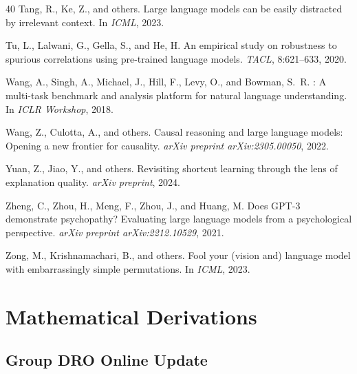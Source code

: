 \documentclass[10pt,twocolumn]{article}
\begin{document}
\begin{thebibliography}{40}
Tang, R., Ke, Z., and others.
\newblock Large language models can be easily distracted by irrelevant context.
\newblock In \emph{ICML}, 2023.

Tu, L., Lalwani, G., Gella, S., and He, H.
\newblock An empirical study on robustness to spurious correlations using
  pre-trained language models.
\newblock \emph{TACL}, 8:621--633, 2020.

Wang, A., Singh, A., Michael, J., Hill, F., Levy, O., and Bowman, S.~R.
: A multi-task benchmark and analysis platform for natural
  language understanding.
\newblock In \emph{ICLR Workshop}, 2018.

Wang, Z., Culotta, A., and others.
\newblock Causal reasoning and large language models: Opening a new
  frontier for causality.
\newblock \emph{arXiv preprint arXiv:2305.00050}, 2022.

Yuan, Z., Jiao, Y., and others.
\newblock Revisiting shortcut learning through the lens of explanation quality.
\newblock \emph{arXiv preprint}, 2024.

Zheng, C., Zhou, H., Meng, F., Zhou, J., and Huang, M.
\newblock Does {GPT-3} demonstrate psychopathy? Evaluating large language
  models from a psychological perspective.
\newblock \emph{arXiv preprint arXiv:2212.10529}, 2021.

Zong, M., Krishnamachari, B., and others.
\newblock Fool your (vision and) language model with embarrassingly simple
  permutations.
\newblock In \emph{ICML}, 2023.

\end{thebibliography}

\appendix
\section{Mathematical Derivations}
\label{app:derivations}

\subsection{Group DRO Online Update}
\label{app:gdro_derivation}
\end{document}
